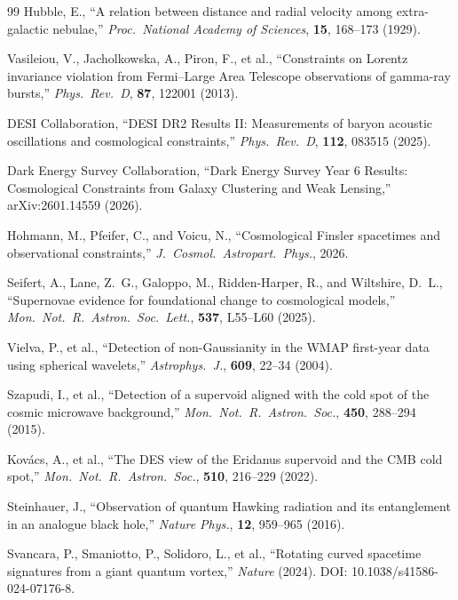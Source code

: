 ﻿\documentclass[12pt,letterpaper]{article}
\begin{document}
\begin{thebibliography}{99}
Hubble, E.,
``A relation between distance and radial velocity among extra-galactic nebulae,''
\textit{Proc.\ National Academy of Sciences}, \textbf{15}, 168--173 (1929).


Vasileiou, V., Jacholkowska, A., Piron, F., et al.,
``Constraints on Lorentz invariance violation from Fermi--Large Area Telescope
observations of gamma-ray bursts,''
\textit{Phys.\ Rev.\ D}, \textbf{87}, 122001 (2013).


DESI Collaboration,
``DESI DR2 Results II: Measurements of baryon acoustic oscillations and cosmological constraints,''
\textit{Phys.\ Rev.\ D}, \textbf{112}, 083515 (2025).


Dark Energy Survey Collaboration,
``Dark Energy Survey Year 6 Results: Cosmological Constraints from Galaxy Clustering and Weak Lensing,''
arXiv:2601.14559 (2026).


Hohmann, M., Pfeifer, C., and Voicu, N.,
``Cosmological Finsler spacetimes and observational constraints,''
\textit{J.\ Cosmol.\ Astropart.\ Phys.}, 2026.


Seifert, A., Lane, Z.~G., Galoppo, M., Ridden-Harper, R., and Wiltshire, D.~L.,
``Supernovae evidence for foundational change to cosmological models,''
\textit{Mon.\ Not.\ R.\ Astron.\ Soc.\ Lett.}, \textbf{537}, L55--L60 (2025).


Vielva, P., et al.,
``Detection of non-Gaussianity in the WMAP first-year data using spherical wavelets,''
\textit{Astrophys.\ J.}, \textbf{609}, 22--34 (2004).


Szapudi, I., et al.,
``Detection of a supervoid aligned with the cold spot of the cosmic microwave background,''
\textit{Mon.\ Not.\ R.\ Astron.\ Soc.}, \textbf{450}, 288--294 (2015).


Kov\'acs, A., et al.,
``The DES view of the Eridanus supervoid and the CMB cold spot,''
\textit{Mon.\ Not.\ R.\ Astron.\ Soc.}, \textbf{510}, 216--229 (2022).



Steinhauer, J.,
``Observation of quantum Hawking radiation and its entanglement in an analogue black hole,''
\textit{Nature Phys.}, \textbf{12}, 959--965 (2016).


Svancara, P., Smaniotto, P., Solidoro, L., et al.,
``Rotating curved spacetime signatures from a giant quantum vortex,''
\textit{Nature} (2024). DOI: 10.1038/s41586-024-07176-8.



\end{thebibliography}
\end{document}
